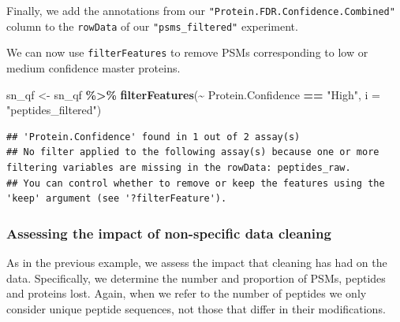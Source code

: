 \documentclass[9pt,a4paper,]{extarticle}
\newenvironment{Shaded}{\begin{snugshade}}{\end{snugshade}}
\newcommand{\AttributeTok}[1]{\textcolor[rgb]{0.13,0.29,0.53}{#1}}
\newcommand{\FunctionTok}[1]{\textcolor[rgb]{0.13,0.29,0.53}{\textbf{#1}}}
\newcommand{\NormalTok}[1]{#1}
\newcommand{\OtherTok}[1]{\textcolor[rgb]{0.56,0.35,0.01}{#1}}
\newcommand{\SpecialCharTok}[1]{\textcolor[rgb]{0.81,0.36,0.00}{\textbf{#1}}}
\newcommand{\StringTok}[1]{\textcolor[rgb]{0.31,0.60,0.02}{#1}}
\begin{document}
Finally, we add the annotations from our \texttt{"Protein.FDR.Confidence.Combined"}
column to the \texttt{rowData} of our \texttt{"psms\_filtered"} experiment.

\begin{Shaded}
\end{Shaded}

We can now use \texttt{filterFeatures} to remove PSMs corresponding to low or medium
confidence master proteins.

\begin{Shaded}
\begin{Highlighting}[]
\NormalTok{sn\_qf }\OtherTok{\textless{}{-}}\NormalTok{ sn\_qf }\SpecialCharTok{\%\textgreater{}\%}
  \FunctionTok{filterFeatures}\NormalTok{(}\SpecialCharTok{\textasciitilde{}}\NormalTok{ Protein.Confidence }\SpecialCharTok{==} \StringTok{"High"}\NormalTok{, }\AttributeTok{i =} \StringTok{"peptides\_filtered"}\NormalTok{)}
\end{Highlighting}
\end{Shaded}

\begin{verbatim}
## 'Protein.Confidence' found in 1 out of 2 assay(s)
## No filter applied to the following assay(s) because one or more filtering variables are missing in the rowData: peptides_raw.
## You can control whether to remove or keep the features using the 'keep' argument (see '?filterFeature').
\end{verbatim}

\subsubsection{Assessing the impact of non-specific data cleaning}\label{assessing-the-impact-of-non-specific-data-cleaning-1}

As in the previous example, we assess the impact that cleaning has had on the
data. Specifically, we determine the number and proportion of PSMs, peptides and
proteins lost. Again, when we refer to the number of peptides we only consider
unique peptide sequences, not those that differ in their modifications.
\end{document}
